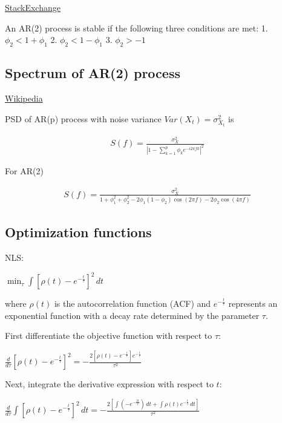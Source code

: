 \documentclass[10pt]{article}
\begin{document}
\href{https://stats.stackexchange.com/questions/118019/a-proof-for-the-stationarity-of-an-ar2}{StackExchange}

An AR(2) process is stable if the following three conditions are met:
1. $\phi_2 < 1 + \phi_1$
2. $\phi_2 < 1 - \phi_1$
3. $\phi_2 > -1$

\subsection{Spectrum of AR(2) process}

\href{https://en.wikipedia.org/wiki/Autoregressive_model#Spectrum}{Wikipedia}

PSD of AR(p) process with noise variance $Var(X_t) = \sigma^2_{X_t}$ is

\begin{align*}
S(f) = \frac{\sigma^2_X}{|1 - \sum_{k=1}^p \phi_k e^{-i2\pi fk}|^2}
\end{align*}

For AR(2)

\begin{align*}
S(f) = \frac{\sigma^2_X}{1 + \phi_1^2 + \phi_2^2 - 2\phi_1(1 - \phi_2)\cos(2\pi f) - 2\phi_2\cos(4\pi f)}
\end{align*}

\subsection{Optimization functions}

NLS:

$\min_{\tau} \int \left[ \rho(t) - e^{-\frac{t}{\tau}} \right]^2 \, dt$  

where $\rho(t)$ is the autocorrelation function (ACF) and $e^{-\frac{t}{\tau}}$ represents an exponential function with a decay rate determined by the parameter $\tau$.

First differentiate the objective function with respect to $\tau$:  

$\frac{d}{d\tau} \left[ \rho(t) - e^{-\frac{t}{\tau}} \right]^2 = - \frac{2 \left[\rho{\left(t \right)} - e^{- \frac{t}{\tau}}\right] e^{- \frac{t}{\tau}}}{\tau^{2}}$  

Next, integrate the derivative expression with respect to $t$:  

$\frac{d}{d\tau} \int \left[ \rho(t) - e^{-\frac{t}{\tau}} \right]^2 \, dt = - \frac{2 \left[\int \left(- e^{- \frac{2 t}{\tau}}\right)\, dt + \int \rho{\left(t \right)} e^{- \frac{t}{\tau}}\, dt\right]}{\tau^{2}}$
\end{document}
